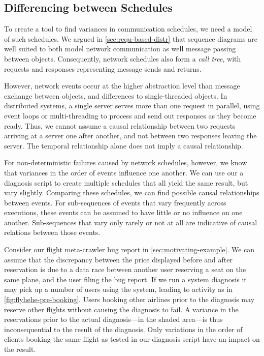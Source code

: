 \subsection{Differencing between Schedules}
\label{sec:diff-betw-call}

To create a tool to find variances in communication schedules, we need
a model of such schedules. We argued in \autoref{sec:requ-based-distr}
that sequence diagrams are well suited to both model network
communication as well message passing between objects. Consequently,
network schedules also form a \emph{call tree}, with requests and
responses representing message sends and returns.

However, network events occur at the higher abstraction level than
message exchange between objects, and differences to single-threaded
objects. In distributed systems, a single server serves more than one
request in parallel, using event loops or multi-threading to process
and send out responses as they become ready. Thus, we cannot assume a
causal relationship between two requests arriving at a server one
after another, and not between two responses leaving the server. The
temporal relationship alone does not imply a causal relationship.

For non-deterministic failures caused by network schedules, however,
we know that variances in the order of events influence one
another. We can use our a diagnosis script to create multiple
schedules that all yield the same result, but vary slightly. Comparing
these schedules, we can find possible causal relationships between
events. For sub-sequences of events that vary frequently across
executions, these events can be assumed to have little or no influence
on one another. Sub-sequences that vary only rarely or not at all are
indicative of causal relations between those events.

Consider our flight meta-crawler bug report in
\autoref{sec:motivating-example}. We can assume that the discrepancy
between the price displayed before and after reservation is due to a
data race between another user reserving a seat on the same plane, and
the user filing the bug report. If we run a system diagnosis it may
pick up a number of users using the system, leading to activity as in
\autoref{fig:flyhehe-pre-booking}. Users booking other airlines prior
to the diagnosis may reserve other flights without causing the
diagnosis to fail. A variance in the reservations prior to the actual
diagnosis---in the shaded area---is thus inconsequential to the result
of the diagnosis. Only variations in the order of clients booking the
same flight as tested in our diagnosis script have an impact on the
result.

